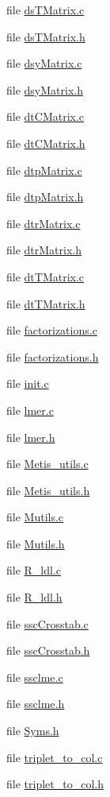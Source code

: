 \begin{CompactItemize}
file \hyperlink{dsTMatrix_8c}{ds\-TMatrix.c}
\item 
file \hyperlink{dsTMatrix_8h}{ds\-TMatrix.h}
\item 
file \hyperlink{dsyMatrix_8c}{dsy\-Matrix.c}
\item 
file \hyperlink{dsyMatrix_8h}{dsy\-Matrix.h}
\item 
file \hyperlink{dtCMatrix_8c}{dt\-CMatrix.c}
\item 
file \hyperlink{dtCMatrix_8h}{dt\-CMatrix.h}
\item 
file \hyperlink{dtpMatrix_8c}{dtp\-Matrix.c}
\item 
file \hyperlink{dtpMatrix_8h}{dtp\-Matrix.h}
\item 
file \hyperlink{dtrMatrix_8c}{dtr\-Matrix.c}
\item 
file \hyperlink{dtrMatrix_8h}{dtr\-Matrix.h}
\item 
file \hyperlink{dtTMatrix_8c}{dt\-TMatrix.c}
\item 
file \hyperlink{dtTMatrix_8h}{dt\-TMatrix.h}
\item 
file \hyperlink{factorizations_8c}{factorizations.c}
\item 
file \hyperlink{factorizations_8h}{factorizations.h}
\item 
file \hyperlink{init_8c}{init.c}
\item 
file \hyperlink{lmer_8c}{lmer.c}
\item 
file \hyperlink{lmer_8h}{lmer.h}
\item 
file \hyperlink{Metis__utils_8c}{Metis\_\-utils.c}
\item 
file \hyperlink{Metis__utils_8h}{Metis\_\-utils.h}
\item 
file \hyperlink{Mutils_8c}{Mutils.c}
\item 
file \hyperlink{Mutils_8h}{Mutils.h}
\item 
file \hyperlink{R__ldl_8c}{R\_\-ldl.c}
\item 
file \hyperlink{R__ldl_8h}{R\_\-ldl.h}
\item 
file \hyperlink{sscCrosstab_8c}{ssc\-Crosstab.c}
\item 
file \hyperlink{sscCrosstab_8h}{ssc\-Crosstab.h}
\item 
file \hyperlink{ssclme_8c}{ssclme.c}
\item 
file \hyperlink{ssclme_8h}{ssclme.h}
\item 
file \hyperlink{Syms_8h}{Syms.h}
\item 
file \hyperlink{triplet__to__col_8c}{triplet\_\-to\_\-col.c}
\item 
file \hyperlink{triplet__to__col_8h}{triplet\_\-to\_\-col.h}
\end{CompactItemize}
